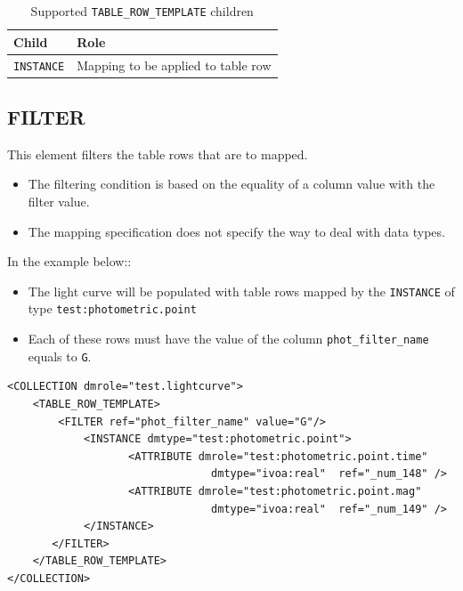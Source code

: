 \documentclass[11pt,a4paper]{ivoa}
\begin{document}
\begin{table}[hbtp]
\small
\centering
\begin{tabulary}{\linewidth}{|L|J|}
       \hline  
          \textbf{Child} &  
          \textbf{Role}\\
       \hline  
          \texttt{INSTANCE}    & 
          Mapping to be applied to table row \\       
       \hline 
     \end{tabulary}
     \caption{Supported  \texttt{TABLE\_ROW\_TEMPLATE} children} 
     \label{trt:row-children}
\end{table}



%
%
\clearpage
\subsection{FILTER}
This element filters the table rows that are to mapped. 

\begin{itemize}
   \item The filtering condition is based on the equality of a column value with the filter value.
   \item The mapping specification does not specify the way to deal with data types.
\end{itemize}

In the example below::

\begin{itemize}
   \item The light curve will be populated with table rows mapped by the \texttt{INSTANCE} of type \texttt{test:photometric.point}
   \item Each of these rows must have the value of the column \texttt{phot\_filter\_name} equals to \texttt{G}.
\end{itemize}

\begin{lstlisting}[caption={FILTER examples},style=XML]
<COLLECTION dmrole="test.lightcurve">
    <TABLE_ROW_TEMPLATE>
        <FILTER ref="phot_filter_name" value="G"/>
            <INSTANCE dmtype="test:photometric.point">
                   <ATTRIBUTE dmrole="test:photometric.point.time" 
                                dmtype="ivoa:real"  ref="_num_148" />
                   <ATTRIBUTE dmrole="test:photometric.point.mag" 
                                dmtype="ivoa:real"  ref="_num_149" />
            </INSTANCE>            
       </FILTER>
    </TABLE_ROW_TEMPLATE>
</COLLECTION>
\end{lstlisting}
\end{document}
